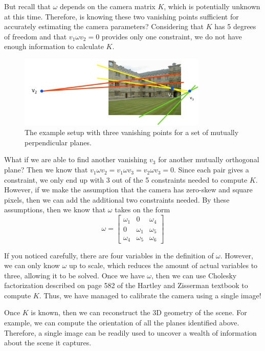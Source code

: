 \documentclass[a4paper, 12pt]{article}
\begin{document}
But recall that $\omega$ depends on the camera matrix $K$, which is potentially unknown at this time. Therefore, is knowing these two vanishing points sufficient for accurately estimating the camera parameters? Considering that $K$ has 5 degrees of freedom and that $v_1 \omega v_2 = 0$ provides only one constraint, we do not have enough information to calculate $K$. 
\begin{figure}[h!]
\centering
\includegraphics[width=0.8\textwidth]{figures/example2.png}
\caption{The example setup with three vanishing points for a set of mutually perpendicular planes.}
\label{fig:example2}
\end{figure}
What if we are able to find another vanishing $v_3$ for another mutually orthogonal plane? Then we know that $v_1\omega v_2 = v_1\omega v_3 = v_2\omega v_3 = 0$. Since each pair gives a constraint, we only end up with 3 out of the 5 constraints needed to compute $K$. However, if we make the assumption that the camera has zero-skew and square pixels, then we can add the additional two constraints needed. By these assumptions, then we know that $\omega$ takes on the form 
\begin{equation}
    \omega = \begin{bmatrix}\omega_1 & 0 & \omega_4 \\ 0 & \omega_1 & \omega_5 \\ \omega_4 & \omega_5 &\omega_6 \end{bmatrix}
\end{equation}

If you noticed carefully, there are four variables in the definition of $\omega$. However, we can only know $\omega$ up to scale, which reduces the amount of actual variables to three, allowing it to be solved. Once we have $\omega$, then we can use Cholesky factorization described on page 582 of the Hartley and Zisserman textbook to compute $K$. Thus, we have managed to calibrate the camera using a single image!

Once $K$ is known, then we can reconstruct the 3D geometry of the scene. For example, we can compute the orientation of all the planes identified above. Therefore, a single image can be readily used to uncover a wealth of information about the scene it captures.
\end{document}
